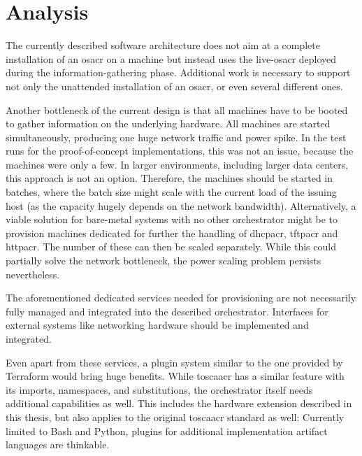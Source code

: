 \chapter{Analysis}



The currently described software architecture does not aim at a complete installation of an \gls{osacr} on a machine but instead uses the live-\gls{osacr} deployed during the information-gathering phase. Additional work is necessary to support not only the unattended installation of an \gls{osacr}, or even several different ones.

Another bottleneck of the current design is that all machines have to be booted to gather information on the underlying hardware. All machines are started simultaneously, producing one huge network traffic and power spike. In the test runs for the proof-of-concept implementations, this was not an issue, because the machines were only a few. In larger environments, including larger data centers, this approach is not an option. Therefore, the machines should be started in batches, where the batch size might scale with the current load of the issuing host (as the capacity hugely depends on the network bandwidth). Alternatively, a viable solution for bare-metal systems with no other orchestrator might be to provision machines dedicated for further the handling of \gls{dhcpacr}, \gls{tftpacr} and \gls{httpacr}. The number of these can then be scaled separately. While this could partially solve the network bottleneck, the power scaling problem persists nevertheless.

The aforementioned dedicated services needed for provisioning are not necessarily fully managed and integrated into the described orchestrator. Interfaces for external systems like networking hardware should be implemented and integrated.

Even apart from these services, a plugin system similar to the one provided by Terraform would bring huge benefits. While \gls{toscaacr} has a similar feature with its imports, namespaces, and substitutions, the orchestrator itself needs additional capabilities as well. This includes the hardware extension described in this thesis, but also applies to the original \gls{toscaacr} standard as well: Currently limited to Bash and Python, plugins for additional implementation artifact languages are thinkable.

